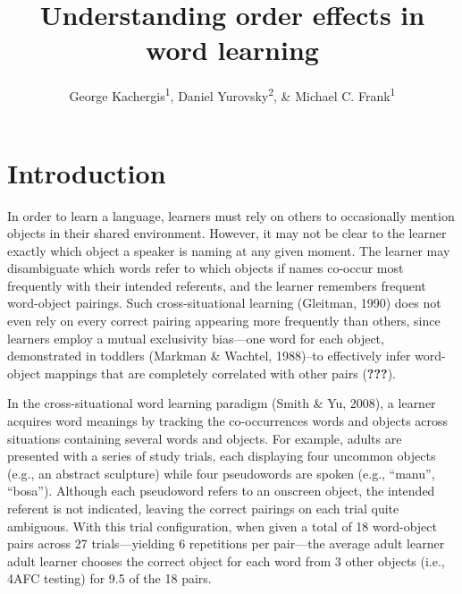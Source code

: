 \documentclass[man,floatsintext]{apa6}
\title{Understanding order effects in word learning}
\author{George Kachergis\textsuperscript{1}, Daniel Yurovsky\textsuperscript{2}, \& Michael C. Frank\textsuperscript{1}}
\date{}
\affiliation{
\vspace{0.5cm}
\textsuperscript{1} Department of Psychology, Stanford University\\\textsuperscript{2} Department of Psychology, Carnegie Mellon University}
\begin{document}
\maketitle

\hypertarget{introduction}{%
\section{Introduction}\label{introduction}}

In order to learn a language, learners must rely on others to occasionally mention objects in their shared environment.
However, it may not be clear to the learner exactly which object a speaker is naming at any given moment.
The learner may disambiguate which words refer to which objects if names co-occur most frequently with their intended referents, and the learner remembers frequent word-object pairings.
Such cross-situational learning (Gleitman, 1990) does not even rely on every correct pairing appearing more frequently than others, since learners employ a mutual exclusivity bias---one word for each object, demonstrated in toddlers (Markman \& Wachtel, 1988)--to effectively infer word-object mappings that are completely correlated with other pairs ({\textbf{???}}).

In the cross-situational word learning paradigm (Smith \& Yu, 2008), a learner acquires word meanings by tracking the co-occurrences words and objects across situations containing several words and objects.
For example, adults are presented with a series of study trials, each displaying four uncommon objects (e.g., an abstract sculpture) while four pseudowords are spoken (e.g., \enquote{manu}, \enquote{bosa}).
Although each pseudoword refers to an onscreen object, the intended referent is not indicated, leaving the correct pairings on each trial quite ambiguous.
With this trial configuration, when given a total of 18 word-object pairs across 27 trials---yielding 6 repetitions per pair---the average adult learner adult learner chooses the correct object for each word from 3 other objects (i.e., 4AFC testing) for 9.5 of the 18 pairs.
\end{document}
